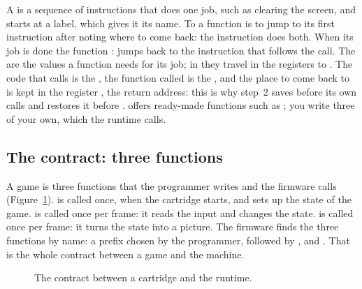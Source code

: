 A  is a sequence of instructions that does one job, such as
clearing the screen, and starts at a label, which gives it its name. To
 a function is to jump to its first instruction after noting where
to come back: the instruction  does both. When its job is done the
function :  jumps back to the instruction that follows
the call. The  are the values a function needs for its job; in
\riscv they travel in the registers  to . The code that calls
is the , the function called is the , and the place
to come back to is kept in the register , the return address: this is
why step~2 saves  before its own calls and restores it before .
\prg offers ready-made functions such as ; you write
three of your own, which the runtime calls.

\subsection{The contract: three functions}

A \prg game is three functions that the programmer writes and the firmware
calls (Figure~\ref{fig:fc:contract}).  is called once, when the
cartridge starts, and sets up the state of the game.  is called
once per frame: it reads the input and changes the state.  is
called once per frame: it turns the state into a picture. The firmware finds
the three functions by name: a prefix chosen by the programmer, followed by
,  and . That is the whole contract
between a game and the machine.

\begin{figure}[htb]
\centering
{}
\caption{The contract between a cartridge and the runtime.}
\label{fig:fc:contract}
\end{figure}

